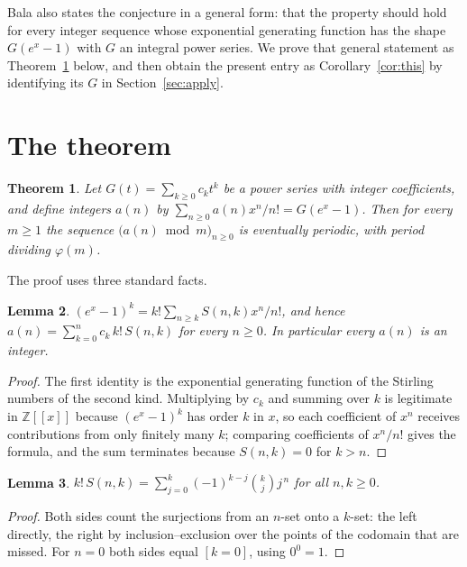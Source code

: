 \documentclass[11pt,a4paper]{article}
\theoremstyle{plain}
\newtheorem{theorem}{Theorem}
\newtheorem{lemma}[theorem]{Lemma}
\theoremstyle{definition}
\newcommand{\Z}{\mathbb{Z}}
\begin{document}
Bala also states the conjecture in a general form: that the property should hold for
every integer sequence whose exponential generating function has the shape $G(e^{x}-1)$
with $G$ an integral power series. We prove that general statement as
Theorem~\ref{thm:main} below, and then obtain the present entry as
Corollary~\ref{cor:this} by identifying its $G$ in Section~\ref{sec:apply}.

\section{The theorem}

\begin{theorem}\label{thm:main}
Let $G(t)=\sum_{k\ge0}c_{k}t^{k}$ be a power series with integer coefficients, and define
integers $a(n)$ by $\sum_{n\ge0}a(n)x^{n}/n!=G(e^{x}-1)$. Then for every $m\ge1$ the
sequence $\bigl(a(n)\bmod m\bigr)_{n\ge0}$ is eventually periodic, with period dividing
$\varphi(m)$.
\end{theorem}

The proof uses three standard facts.

\begin{lemma}\label{lem:stirling}
$(e^{x}-1)^{k}=k!\sum_{n\ge k}S(n,k)x^{n}/n!$, and hence
$a(n)=\sum_{k=0}^{n}c_{k}\,k!\,S(n,k)$ for every $n\ge0$. In particular every $a(n)$ is an
integer.
\end{lemma}

\begin{proof}
The first identity is the exponential generating function of the Stirling numbers of the
second kind. Multiplying by $c_{k}$ and summing over $k$ is legitimate in $\Z[[x]]$
because $(e^{x}-1)^{k}$ has order $k$ in $x$, so each coefficient of $x^{n}$ receives
contributions from only finitely many $k$; comparing coefficients of $x^{n}/n!$ gives the
formula, and the sum terminates because $S(n,k)=0$ for $k>n$.
\end{proof}

\begin{lemma}\label{lem:power}
$k!\,S(n,k)=\sum_{j=0}^{k}(-1)^{k-j}\binom{k}{j}j^{\,n}$ for all $n,k\ge0$.
\end{lemma}

\begin{proof}
Both sides count the surjections from an $n$-set onto a $k$-set: the left directly, the
right by inclusion--exclusion over the points of the codomain that are missed. For $n=0$
both sides equal $[k=0]$, using $0^{0}=1$.
\end{proof}
\end{document}
